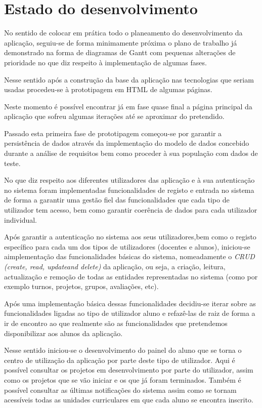 \section{Estado do desenvolvimento}
No sentido de colocar em prática todo o planeamento do desenvolvimento da aplicação, seguiu-se de forma minimamente próxima o plano de trabalho já demonstrado na forma de diagramas de Gantt com pequenas alterações de prioridade no que diz respeito à implementação de algumas fases.

Nesse sentido após a construção da base da aplicação nas tecnologias que seriam usadas procedeu-se à prototipagem em HTML de algumas páginas.

Neste momento é possível encontrar já em fase quase final a página principal da aplicação que sofreu algumas iterações até se aproximar do pretendido.

Passado esta primeira fase de prototipagem começou-se por garantir a persistência de dados através da implementação do modelo de dados concebido durante a análise de requisitos bem como proceder à sua população com dados de teste.

No que diz respeito aos diferentes utilizadores das aplicação e à sua autenticação no sistema foram implementadas funcionalidades de registo e entrada  no sistema de forma a garantir uma gestão fiel das funcionalidades que cada tipo de utilizador tem acesso, bem como garantir coerência de dados para cada utilizador individual.

Após garantir a autenticação no sistema aos seus utilizadores,bem como o registo específico para cada um dos tipos de utilizadores (docentes e alunos), iniciou-se aimplementação das funcionalidades básicas do sistema, nomeadamente o \textit{CRUD (create, read, updateand delete)} da aplicação, ou seja, a criação, leitura, actualização e remoção de todas as entidades representadas no sistema (como por exemplo turnos, projetos, grupos, avaliações, etc).

Após uma implementação básica dessas funcionalidades decidiu-se iterar sobre as funcionalidades ligadas ao tipo de utilizador aluno e refazê-las de raiz de forma a ir de encontro ao que realmente são as funcionalidades que pretendemos disponibilizar aos alunos da aplicação.

Nesse sentido iniciou-se o desenvolvimento do painel do aluno que se torna o  centro de utilização da aplicação por parte deste tipo de utilizador.
Aqui é possível consultar os projetos em desenvolvimento por parte do utilizador, assim como os projetos que se vão iniciar e os que já foram terminados.
Também é possível consultar as últimas notificações do sistema assim como se tornam acessíveis todas as unidades curriculares em que cada aluno se encontra inscrito.

